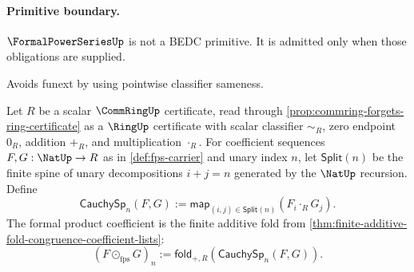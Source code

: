 \paragraph{Primitive boundary.}
\(\FormalPowerSeriesUp\) is not a BEDC primitive. It is admitted only when those obligations are supplied.

\begin{remark}
\label{rem:fps-zero-axiom-note}
Avoids funext by using pointwise classifier sameness.
\end{remark}

\begin{definition}
\label{def:fps-cauchy-coefficient-spine}
Let $R$ be a scalar $\CommRingUp$ certificate, read through \autoref{prop:commring-forgets-ring-certificate} as a $\RingUp$ certificate with scalar classifier $\sim_R$, zero endpoint $0_R$, addition $+_R$, and multiplication $\cdot_R$. For coefficient sequences $F,G:\NatUp\to R$ as in \autoref{def:fps-carrier} and unary index $n$, let $\mathsf{Split}(n)$ be the finite spine of unary decompositions $i+j=n$ generated by the $\NatUp$ recursion. Define
$$
\mathsf{CauchySp}_n(F,G)
:=
\mathsf{map}_{(i,j)\in\mathsf{Split}(n)}(F_i\cdot_R G_j).
$$
The formal product coefficient is the finite additive fold from \autoref{thm:finite-additive-fold-congruence-coefficient-lists}:
$$
(F\odot_{\mathrm{fps}}G)_n
:=
\mathsf{fold}_{+,R}(\mathsf{CauchySp}_n(F,G)).
$$
\end{definition}

